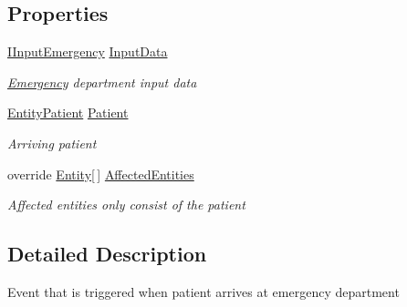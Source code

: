 \subsection*{Properties}
\begin{DoxyCompactItemize}
\item 
\hyperlink{interface_general_health_care_elements_1_1_department_models_1_1_emergency_1_1_i_input_emergency}{I\+Input\+Emergency} \hyperlink{class_general_health_care_elements_1_1_department_models_1_1_emergency_1_1_event_emergency_patient_arrival_adfeb92a2f5ab336c14e2409bb10eec41}{Input\+Data}
\begin{DoxyCompactList}\small\item\em \hyperlink{namespace_general_health_care_elements_1_1_department_models_1_1_emergency}{Emergency} department input data \end{DoxyCompactList}\item 
\hyperlink{class_general_health_care_elements_1_1_entities_1_1_entity_patient}{Entity\+Patient} \hyperlink{class_general_health_care_elements_1_1_department_models_1_1_emergency_1_1_event_emergency_patient_arrival_ac8efab793cad081366e8c4c7749687cd}{Patient}
\begin{DoxyCompactList}\small\item\em Arriving patient \end{DoxyCompactList}\item 
override \hyperlink{class_simulation_core_1_1_h_c_c_m_elements_1_1_entity}{Entity}\mbox{[}$\,$\mbox{]} \hyperlink{class_general_health_care_elements_1_1_department_models_1_1_emergency_1_1_event_emergency_patient_arrival_a6eba2e2ae9c982db6928786c023c7595}{Affected\+Entities}
\begin{DoxyCompactList}\small\item\em Affected entities only consist of the patient \end{DoxyCompactList}\end{DoxyCompactItemize}


\subsection{Detailed Description}
Event that is triggered when patient arrives at emergency department 



